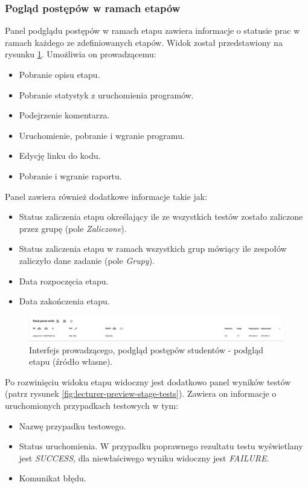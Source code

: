 \subsubsection{Pogląd postępów w ramach etapów}

Panel podglądu postępów w ramach etapu zawiera informacje o statusie prac w ramach każdego ze zdefiniowanych etapów.
Widok został przedstawiony na rysunku \ref{fig:lecturer-preview-stage}.
Umożliwia on prowadzącemu:
\begin {itemize}
    \item Pobranie opisu etapu.
    \item Pobranie statystyk z uruchomienia programów.
    \item Podejrzenie komentarza.
    \item Uruchomienie, pobranie i wgranie programu.
    \item Edycję linku do kodu.
    \item Pobranie i wgranie raportu.
\end {itemize}

Panel zawiera również dodatkowe informacje takie jak:
\begin{itemize}
    \item Status zaliczenia etapu określający ile ze wszystkich testów zostało zaliczone przez grupę (pole \textit{Zaliczone}).
    \item Status zaliczenia etapu w ramach wszystkich grup mówiący ile zespołów zaliczyło dane zadanie (pole \textit{Grupy}).
    \item Data rozpoczęcia etapu.
    \item Data zakończenia etapu.
\end{itemize}

\begin{figure}[h]
    \centering
    \includegraphics[width = 13cm]{chapter04/lecturer_preview_stage.png}
    \caption{Interfejs prowadzącego, podgląd postępów studentów - podgląd etapu (źródło własne).}
    \label{fig:lecturer-preview-stage}
\end{figure}

Po rozwinięciu widoku etapu widoczny jest dodatkowo panel wyników testów (patrz rysunek \ref{fig:lecturer-preview-stage-tests}).
Zawiera on informacje o uruchomionych przypadkach testowych w tym:
\begin{itemize}
    \item Nazwę przypadku testowego.
    \item Status uruchomienia. W przypadku poprawnego rezultatu testu wyświetlany jest \textit{SUCCESS}, dla niewłaściwego wyniku widoczny jest \textit{FAILURE}.
    \item Komunikat błędu.
\end{itemize}

